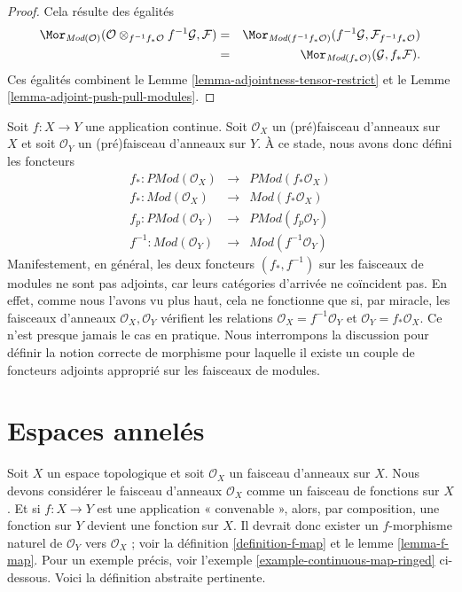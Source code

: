 \begin{proof}
Cela résulte des égalités
\begin{eqnarray*}
\Mor_{\textit{Mod}(\mathcal{O})}(
\mathcal{O} \otimes_{f^{-1}f_*\mathcal{O}} f^{-1}\mathcal{G}, \mathcal{F})
& = &
\Mor_{\textit{Mod}(f^{-1}f_*\mathcal{O})}(
f^{-1}\mathcal{G}, \mathcal{F}_{f^{-1}f_*\mathcal{O}}) \\
& = &
\Mor_{\textit{Mod}(f_*\mathcal{O})}(\mathcal{G}, f_*\mathcal{F}).
\end{eqnarray*}
Ces égalités combinent le
Lemme \ref{lemma-adjointness-tensor-restrict}
et le Lemme \ref{lemma-adjoint-push-pull-modules}.
\end{proof}

\noindent
Soit $f : X \to Y$ une application continue.
Soit $\mathcal{O}_X$ un (pré)faisceau d'anneaux sur $X$ et
soit $\mathcal{O}_Y$ un (pré)faisceau d'anneaux sur $Y$.
À ce stade, nous avons donc défini les foncteurs
\begin{eqnarray*}
f_* : \textit{PMod}(\mathcal{O}_X) &
\longrightarrow &
\textit{PMod}(f_*\mathcal{O}_X) \\
f_* : \textit{Mod}(\mathcal{O}_X) &
\longrightarrow &
\textit{Mod}(f_*\mathcal{O}_X) \\
f_p : \textit{PMod}(\mathcal{O}_Y) &
\longrightarrow &
\textit{PMod}(f_p\mathcal{O}_Y) \\
f^{-1} : \textit{Mod}(\mathcal{O}_Y) &
\longrightarrow &
\textit{Mod}(f^{-1}\mathcal{O}_Y)
\end{eqnarray*}
Manifestement, en général, les deux foncteurs $(f_*, f^{-1})$
sur les faisceaux de modules ne sont pas adjoints, car leurs catégories d'arrivée
ne coïncident pas. En effet, comme nous l'avons vu plus haut, cela ne fonctionne que si, par miracle, les
faisceaux d'anneaux $\mathcal{O}_X, \mathcal{O}_Y$ vérifient les
relations $\mathcal{O}_X = f^{-1}\mathcal{O}_Y$ et
$\mathcal{O}_Y = f_*\mathcal{O}_X$. Ce n'est presque jamais
le cas en pratique. Nous interrompons la discussion pour définir
la notion correcte de morphisme pour laquelle il existe un couple
de foncteurs adjoints approprié sur les faisceaux de modules.

\section{Espaces annelés}
\label{section-ringed-spaces}

\noindent
Soit $X$ un espace topologique et soit $\mathcal{O}_X$
un faisceau d'anneaux sur $X$. Nous devons
considérer le faisceau d'anneaux $\mathcal{O}_X$ comme un faisceau de fonctions
sur $X$. Et si $f : X \to Y$ est une application « convenable », alors, par composition,
une fonction sur $Y$ devient une fonction sur $X$.
Il devrait donc exister un
$f$-morphisme naturel de $\mathcal{O}_Y$ vers $\mathcal{O}_X$ ;
voir la définition \ref{definition-f-map} et le
lemme \ref{lemma-f-map}.
Pour un exemple précis, voir
l'exemple \ref{example-continuous-map-ringed} ci-dessous. Voici la
définition abstraite pertinente.


